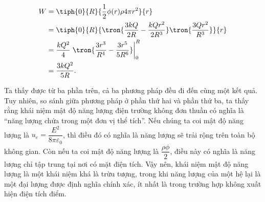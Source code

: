 \begin{loigiai}
\begin{enumerate}[1)]
\begin{equation*}
            \begin{aligned}
                W&=\tiph{0}{R}{\dfrac{1}{2}\phi(r)\rho 4\pi r^2}{r}\\
                &=\tiph{0}{R}{\tron{\dfrac{3kQ}{2R}-\dfrac{kQr^2}{2R^3}}\tron{\dfrac{3Qr^2}{R^3}}}{r}\\
                &=\dfrac{kQ^2}{4}\left.\tron{\dfrac{3r^3}{R^4}-\dfrac{3r^5}{5R^6}}\right|_0^R\\
                &=\dfrac{3kQ^2}{5R}.
            \end{aligned}
        \end{equation*}
    \end{enumerate}
    Ta thấy được từ ba phần trên, cả ba phương pháp đều đi đến cùng một kết quả. Tuy nhiên, so sánh giữa phương pháp ở phần thứ hai và phần thứ ba, ta thấy rằng khái niệm mật độ năng lượng điện trường không đơn thuần có nghĩa là ``năng lượng chứa trong một đơn vị thể tích''. Nếu chúng ta coi mật độ năng lượng là $u_e=\dfrac{E^2}{8\pi \varepsilon_0}$, thì điều đó có nghĩa là năng lượng sẽ trải rộng trên toàn bộ không gian. Còn nếu ta coi mật độ năng lượng là $\dfrac{\rho\phi}{2}$, điều này có nghĩa là năng lượng chỉ tập trung tại nơi có mặt điện tích. Vậy nên, khái niệm mật độ năng lượng là một khái niệm khá là trừu tượng, trong khi năng lượng của một hệ lại là một đại lượng được định nghĩa chính xác, ít nhất là trong trường hợp không xuất hiện điện tích điểm.
    \end{loigiai}
    
